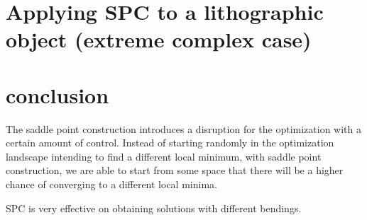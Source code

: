 \section{Applying SPC to a lithographic object (extreme complex case)}


\section{conclusion}

The saddle point construction introduces a disruption for the optimization with a certain amount of control. Instead of starting randomly in the optimization landscape intending to find a different local minimum, with saddle point construction, we are able to start from some space that there will be a higher chance of converging to a different local minima. 

SPC is very effective on obtaining solutions with different bendings. 


